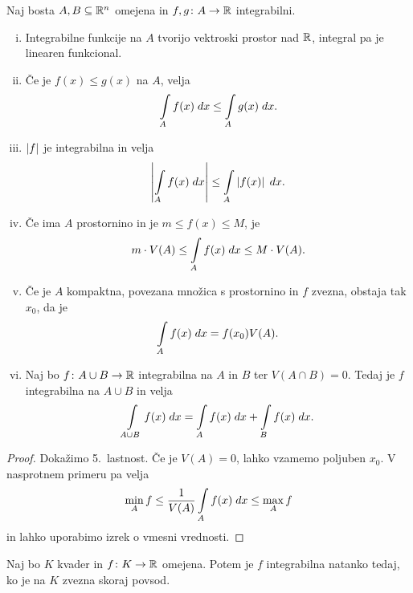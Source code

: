 \begin{izrek}
Naj bosta $A, B \subseteq \mathbb{R}^n$ omejena in $f, g \colon A \to \mathbb{R}$
integrabilni.

\begin{enumerate}[i)]
\item Integrabilne funkcije na $A$ tvorijo vektroski prostor nad
$\mathbb{R}$, integral pa je linearen funkcional.
\item Če je $f(x) \leq g(x)$ na $A$, velja
\[
\int\limits_A f(x)\;dx \leq \int\limits_A g(x)\;dx.
\]
\item $\left\lvert f\right\rvert$ je integrabilna in velja
\[
\left\lvert \int\limits_A f(x)\;dx\right\rvert \leq \int\limits_A \left\lvert f(x)\right\rvert\;dx.
\]
\item Če ima $A$ prostornino in je $m \leq f(x) \leq M$, je
\[
m \cdot V(A) \leq \int\limits_A f(x)\;dx \leq M \cdot V(A).
\]
\item Če je $A$ kompaktna, povezana množica s prostornino in $f$
zvezna, obstaja tak $x_0$, da je
\[
\int\limits_A f(x)\;dx = f(x_0) V(A).
\]
\item Naj bo $f \colon A \cup B \to \mathbb{R}$ integrabilna na $A$ in $B$
ter $V(A \cap B) = 0$. Tedaj je $f$ integrabilna na $A \cup B$ in
velja
\[
\int\limits_{A \cup B} f(x)\;dx = \int\limits_A f(x)\;dx + \int\limits_B f(x)\;dx.
\]
\end{enumerate} 
\end{izrek}

\begin{proof}
Dokažimo 5.\ lastnost. Če je $V(A) = 0$, lahko vzamemo poljuben
$x_0$. V nasprotnem primeru pa velja
\[
\min_A f \leq \frac{1}{V(A)} \int\limits_A f(x)\;dx \leq \max_A f
\]
in lahko uporabimo izrek o vmesni vrednosti.
\end{proof}

\begin{izrek}[Lebesque]
Naj bo $K$ kvader in $f \colon K \to \mathbb{R}$ omejena. Potem je $f$
integrabilna natanko tedaj, ko je na $K$ zvezna skoraj povsod.
\end{izrek}

